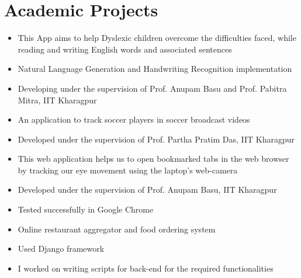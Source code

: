 \documentclass[10pt,a4paper]{moderncv}
\begin{document}
\section{Academic Projects}


{\begin{itemize}
 \item{\normalsize This App aims to help Dyslexic children overcome the difficulties faced, while reading and writing English words and associated sentences }    
 \item {\normalsize Natural Language Generation and Handwriting Recognition implementation } 
\item {\normalsize Developing under the supervision of Prof. Anupam Basu and Prof. Pabitra Mitra, IIT Kharagpur} 
\end{itemize}}


{\begin{itemize}
 \item{\normalsize An application to track soccer players in soccer broadcast videos }
\item {\normalsize Developed under the supervision of Prof. Partha Pratim Das, IIT Kharagpur} 
\end{itemize}}


{\begin{itemize}
 \item{\normalsize This web application helps us to open bookmarked tabs in the web browser by tracking our eye movement using the laptop's web-camera}
\item {\normalsize Developed under the supervision of Prof. Anupam Basu, IIT Kharagpur} 
\item {\normalsize Tested successfully in Google Chrome }          
\end{itemize}}


{\begin{itemize}
\item {\normalsize Online restaurant aggregator and food ordering system }
\item {\normalsize Used Django framework }
\item {\normalsize I worked on writing scripts for back-end for the required functionalities}
\end{itemize}}
\end{document}
